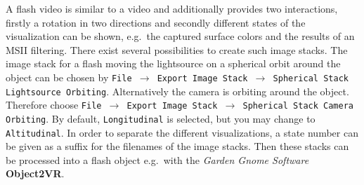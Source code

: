 A flash video is similar to a video and additionally provides two interactions, firstly a rotation in two directions and secondly different states of the visualization can be shown, e.g.~the captured surface colors and the results of an MSII filtering. There exist several possibilities to create such image stacks. 
The  image stack for a flash moving the lightsource on a spherical orbit around the object can be chosen by \texttt{File $\rightarrow$ Export Image Stack $\rightarrow$ Spherical Stack Lightsource Orbiting}. Alternatively the camera is orbiting around the object. Therefore choose  \texttt{File $\rightarrow$ Export Image Stack $\rightarrow$ Spherical Stack Camera Orbiting}. By default, \texttt{Longitudinal} is selected, but you may change to \texttt{Altitudinal}. In order to separate the different visualizations, a state number can be given as a suffix for the filenames of the image stacks. Then these stacks can be processed into a flash object e.g.~with the {\em Garden Gnome Software} {\bf Object2VR}.







